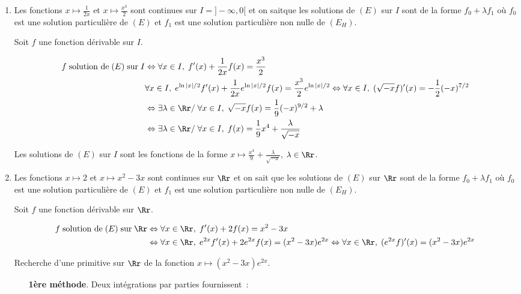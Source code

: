 {{\begin{enumerate}
Les solutions de $(E)$ sur  $I$ sont les fonctions de la forme $x\mapsto\frac{x}{2}+\frac{\ln(-x)+\lambda}{x}$,
$\lambda\in\Rr$.

\item  Les fonctions $x\mapsto\frac{1}{2x}$ et $x\mapsto\frac{x^3}{2}$ sont continues sur $I=]-\infty,0[$ et on
saitque les solutions de $(E)$ sur $I$ sont de la forme
$f_0+\lambda f_1$ où $f_0$ est une solution particulière de $(E)$ et $f_1$ est une solution particulière non nulle de
$(E_H)$.

Soit $f$ une fonction dérivable sur $I$.

\begin{align*}\ensuremath
f\;\mbox{solution de}\;(E)\;\mbox{sur}\;I&\Leftrightarrow\forall x\in I,\;f'(x)+\frac{1}{2x}f(x)=\frac{x^3}{2}\\
 &\forall x\in I,\;e^{\ln|x|/2}f'(x)+\frac{1}{2x}e^{\ln|x|/2}f(x)=\frac{x^3}{2}e^{\ln|x|/2}\Leftrightarrow\forall x\in
I,\;(\sqrt{-x}f)'(x)=-\frac{1}{2}(-x)^{7/2}\\
 &\Leftrightarrow\exists\lambda\in\Rr/\;\forall x\in I,\;\sqrt{-x}f(x)=\frac{1}{9}(-x)^{9/2}+\lambda\\
 &\Leftrightarrow\exists\lambda\in\Rr/\;\forall x\in I,\;f(x)=\frac{1}{9}x^4+\frac{\lambda}{\sqrt{-x}}
\end{align*}

Les solutions de $(E)$ sur  $I$ sont les fonctions de la forme $x\mapsto\frac{x^4}{9}+\frac{\lambda}{\sqrt{-x}}$,
$\lambda\in\Rr$.

\item  Les fonctions $x\mapsto2$ et $x\mapsto x^2-3x$ sont continues sur $\Rr$ et on sait
que les solutions de $(E)$ sur $\Rr$ sont de la forme
$f_0+\lambda f_1$ où $f_0$ est une solution particulière de $(E)$ et $f_1$ est une solution particulière non nulle de
$(E_H)$.

Soit $f$ une fonction dérivable sur $\Rr$.

\begin{align*}\ensuremath
f\;\mbox{solution de}\;(E)\;\mbox{sur}\;\Rr&\Leftrightarrow\forall x\in\Rr,\;f'(x)+2f(x)=x^2-3x\\
 &\Leftrightarrow\forall x\in\Rr,\;e^{2x}f'(x)+2e^{2x}f(x)=(x^2-3x)e^{2x}\Leftrightarrow\forall
x\in\Rr,\;(e^{2x}f)'(x)=(x^2-3x)e^{2x}
\end{align*}

Recherche d'une primitive sur ${\Rr}$ de la fonction $x\mapsto(x^2-3x)e^{2x}$.
\begin{itemize}
\item[\textbf{1ère méthode}.] Deux intégrations par parties fournissent~:


\end{itemize}
\end{enumerate}}}
